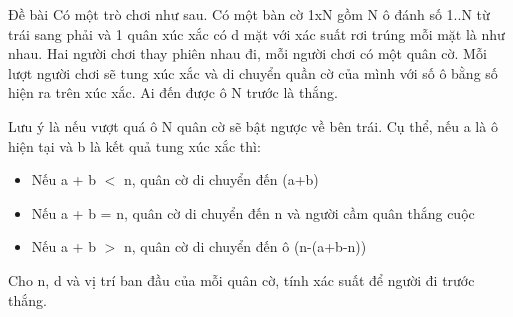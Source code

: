 Đề bài
Có một trò chơi như sau. Có một bàn cờ 1xN gồm N ô đánh số 1..N từ trái sang phải và 1 quân xúc xắc có d mặt với xác suất rơi trúng mỗi mặt là như nhau. Hai người chơi thay phiên nhau đi, mỗi người chơi có một quân cờ. Mỗi lượt người chơi sẽ tung xúc xắc và di chuyển quần cờ của mình với số ô bằng số hiện ra trên xúc xắc. Ai đến được ô N trước là thắng.  

   Lưu ý là nếu vượt quá ô N quân cờ sẽ bật ngược về bên trái. Cụ thể, nếu a là ô hiện tại và b là kết quả tung xúc xắc thì:  
\begin{itemize}
	\item     Nếu a + b $<$ n, quân cờ di chuyển đến (a+b)   
	\item     Nếu a + b = n, quân cờ di chuyển đến n và người cầm quân  thắng cuộc   
	\item     Nếu a + b $>$ n, quân cờ di chuyển đến ô (n-(a+b-n))   
\end{itemize}

   Cho n, d và vị trí ban đầu của mỗi quân cờ, tính xác suất để người đi trước thắng.